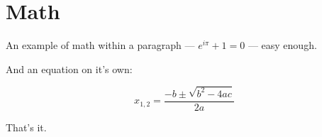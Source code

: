 
\def\mytitle{MultiMarkdown Math Example}

\part{Math}
\label{math}

An example of math within a paragraph --- ${e}^{i\pi }+1=0$ --- easy
enough.

And an equation on it's own:

\[ {x}_{1,2}=\frac{-b\pm \sqrt{{b}^{2}-4ac}}{2a} \]

That's it.




